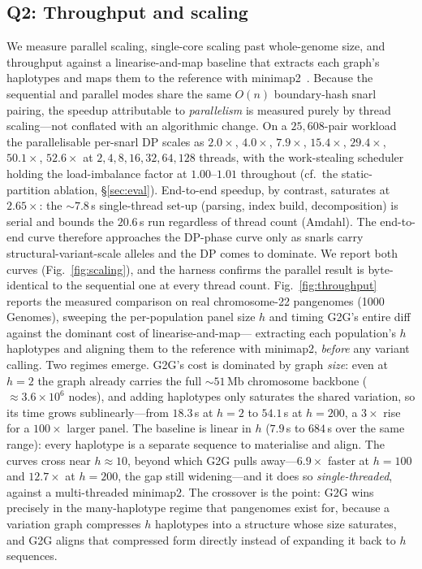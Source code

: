 \documentclass[conference]{IEEEtran}
\theoremstyle{plain}
\theoremstyle{definition}
\begin{document}
\subsection{Q2: Throughput and scaling}
We measure parallel scaling, single-core scaling past whole-genome size, and
throughput against a linearise-and-map baseline that extracts each graph's
haplotypes and maps them to the reference with minimap2~\cite{li2018minimap2}. Because the sequential and parallel
modes share the same $O(n)$ boundary-hash snarl pairing, the speedup
attributable to \emph{parallelism} is measured purely by thread scaling---not
conflated with an algorithmic change. On a $25{,}608$-pair workload the
parallelisable per-snarl DP scales as $2.0\times$, $4.0\times$, $7.9\times$,
$15.4\times$, $29.4\times$, $50.1\times$, $52.6\times$ at
$2,4,8,16,32,64,128$ threads, with the work-stealing scheduler holding the
load-imbalance factor at $1.00$--$1.01$ throughout (cf.\ the static-partition
ablation, \S\ref{sec:eval}). End-to-end speedup, by contrast, saturates at
$2.65\times$: the ${\sim}7.8$\,s single-thread set-up (parsing, index build,
decomposition) is serial and bounds the $20.6$\,s run regardless of thread count
(Amdahl). The end-to-end curve therefore approaches the DP-phase curve only as
snarls carry structural-variant-scale alleles and the DP comes to dominate. We
report both curves (Fig.~\ref{fig:scaling}), and the harness confirms the parallel
result is byte-identical to the sequential one at every thread count.
Fig.~\ref{fig:throughput} reports the measured comparison on real chromosome-22
pangenomes (1000 Genomes), sweeping the per-population panel size $h$ and timing
\textsc{G2G}'s entire diff against the dominant cost of linearise-and-map---
extracting each population's $h$ haplotypes and aligning them to the reference
with minimap2, \emph{before} any variant calling. Two regimes emerge.
\textsc{G2G}'s cost is dominated by graph \emph{size}: even at $h{=}2$ the graph
already carries the full ${\sim}51$\,Mb chromosome backbone
(${\approx}3.6{\times}10^6$ nodes), and adding haplotypes only saturates the
shared variation, so its time grows sublinearly---from $18.3$\,s at $h{=}2$ to
$54.1$\,s at $h{=}200$, a $3\times$ rise for a $100\times$ larger panel. The
baseline is linear in $h$ ($7.9$\,s to $684$\,s over the same range): every
haplotype is a separate sequence to materialise and align. The curves cross near
$h{\approx}10$, beyond which \textsc{G2G} pulls away---$6.9\times$ faster at
$h{=}100$ and $12.7\times$ at $h{=}200$, the gap still widening---and it does so
\emph{single-threaded}, against a multi-threaded minimap2. The crossover is the point: \textsc{G2G} wins
precisely in the many-haplotype regime that pangenomes exist for, because a
variation graph compresses $h$ haplotypes into a structure whose size saturates,
and \textsc{G2G} aligns that compressed form directly instead of expanding it back
to $h$ sequences.
\end{document}
